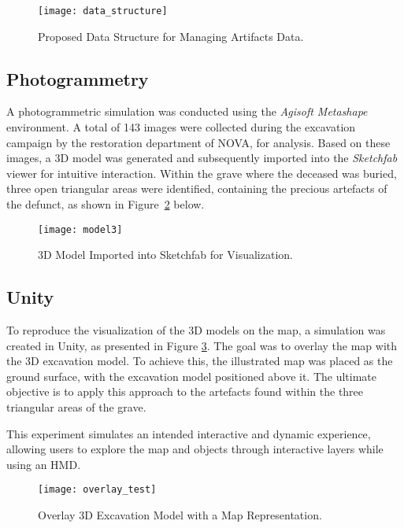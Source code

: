 \begin{figure}[h]
    \centering
    \texttt{[image: data\_structure]}
    \caption{Proposed Data Structure for Managing Artifacts Data.}
    \label{fig:data_strucutre}
\end{figure}


\subsection{Photogrammetry}
\label{sec:photogrammetry_previous} 

A photogrammetric simulation was conducted using the \textit{Agisoft Metashape} environment. A total of 143 images were collected during the excavation campaign by the restoration department of NOVA, for analysis. 
Based on these images, a \gls{3D} model was generated and subsequently imported into the \textit{Sketchfab} viewer for intuitive interaction.
Within the grave where the deceased was buried, three open triangular areas were identified, containing the precious artefacts of the defunct, as shown in Figure~\ref{fig:model3} below.

\begin{figure}[h]
    \centering
    \texttt{[image: model3]}
    \caption{\gls{3D} Model Imported into Sketchfab for Visualization.}
    \label{fig:model3}
\end{figure}


\subsection{Unity}
\label{sec:unity} 

To reproduce the visualization of the \gls{3D} models on the map, a simulation was created in Unity, as presented in Figure \ref{fig:overlay}. The goal was to overlay the map with the \gls{3D} excavation model.
To achieve this, the illustrated map was placed as the ground surface, with the excavation model positioned above it. The ultimate objective is to apply this approach to the artefacts found within the three triangular areas of the grave.

This experiment simulates an intended interactive and dynamic experience, allowing users to explore the map and objects through interactive layers while using an \gls{HMD}.


\begin{figure}[h]
    \centering
    \texttt{[image: overlay\_test]}
    \caption{Overlay \gls{3D} Excavation Model with a Map Representation.}
    \label{fig:overlay}
\end{figure}


